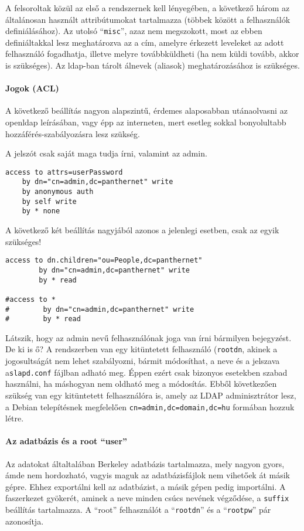\documentclass[fleqn,10pt,a4paper,titlepage]{article}
\begin{document}
  A felsoroltak közül az első a rendszernek kell lényegében, a következő három az általánosan használt attribútumokat tartalmazza
  (többek között a felhasználók definiálásához). Az utolsó ``\texttt{misc}'', azaz nem megszokott, most az ebben
  definiáltakkal lesz meghatározva az a cím, amelyre érkezett leveleket az adott felhasználó fogadhatja, illetve melyre
  továbbküldheti (ha nem küldi tovább, akkor is szükséges). Az ldap-ban tárolt álnevek (aliasok) meghatározásához is
  szükséges.
  
  \paragraph{Jogok (ACL)} A következő beállítás nagyon alapszintű, érdemes alaposabban utánaolvasni az openldap
  leírásában, vagy épp az interneten, mert esetleg sokkal bonyolultabb hozzáférés-szabályozásra lesz szükség.

  A jelszót csak saját maga tudja írni, valamint az admin.

\begin{Verbatim}
access to attrs=userPassword
    by dn="cn=admin,dc=panthernet" write
    by anonymous auth
    by self write
    by * none
\end{Verbatim}    

  A következő két beállítás nagyjából azonos a jelenlegi esetben, csak az egyik szükséges!

\begin{Verbatim}
access to dn.children="ou=People,dc=panthernet"
        by dn="cn=admin,dc=panthernet" write
        by * read

#access to *
#        by dn="cn=admin,dc=panthernet" write
#        by * read
\end{Verbatim}


  Látszik, hogy az admin nevű felhasználónak joga van írni bármilyen bejegyzést. De ki is ő? A rendszerben van egy
  kitüntetett felhasználó (\texttt{rootdn}, akinek a jogosultságát nem lehet szabályozni, bármit módosíthat, a
  neve és a jelszava a\texttt{slapd.conf} fájlban adható meg. Éppen ezért csak bizonyos esetekben szabad használni, ha
  máshogyan nem oldható meg a módosítás. Ebből következően szükség van egy kitüntetett felhasználóra is, amely az LDAP
  adminisztrátor lesz, a Debian telepítésnek megfelelően \texttt{cn=admin,dc=domain,dc=hu} formában hozzuk létre.
  
  
  \paragraph{Az adatbázis és a root ``user''} Az adatokat általtalában Berkeley adatbázis tartalmazza, mely nagyon
  gyors, ámde nem hordozható, vagyis maguk az adatbázisfájlok nem vihetőek át másik gépre. Ehhez exportálni kell az
  adatbázist, a másik gépen pedig importálni. A faszerkezet gyökerét, aminek a neve minden csúcs nevének végződése, a
  \texttt{suffix} beállítás tartalmazza. A ``root'' felhasználót a ``\texttt{rootdn}'' és a ``\texttt{rootpw}'' pár
  azonosítja.
 
\end{document}
